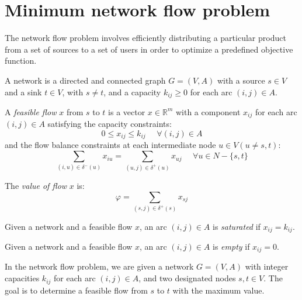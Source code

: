 \section{Minimum network flow problem}

The network flow problem involves efficiently distributing a particular product from a set of sources to a set of users in order to optimize a predefined objective function.
    \begin{definition}
    A network is a directed and connected graph $G = (V,A)$ with a source $s \in V$ and a sink $t \in V$, with $s \neq t$, and a capacity $k_{ij} \geq 0$ for each arc 
    $(i,j) \in A$. 

    A \emph{feasible flow} $x$ from $s$ to $t$ is a vector $x \in \mathbb{R}^m$ with a component $x_{ij}$ for each arc $(i,j) \in A$ satisfying the capacity constraints:
    \[0 \leq x_{ij} \leq k_{ij} \:\:\:\:\:\: \forall (i,j) \in A\]
    and the flow balance constraints at each intermediate node $u \in V (u \neq s,t)$: 
    \[\sum_{(i,u)\in \delta^{-}(u)}x_{iu}=\sum_{(u,j)\in \delta^{+}(u)}x_{uj} \:\:\:\:\:\: \forall u \in N-\{s,t\}\]

    The \emph{value of flow} $x$ is:
    \[\varphi = \sum_{(s,j) \in \delta^{+}(s)} x_{sj}\]

    Given a network and a feasible flow $x$, an arc $(i,j) \in A$ is \emph{saturated} if $x_{ij} = k_{ij}$. 

    Given a network and a feasible flow $x$, an arc $(i,j) \in A$ is \emph{empty} if $x_{ij} = 0$. 
\end{definition}
In the network flow problem, we are given a network $G = (V,A)$ with integer capacities $k_{ij}$ for each arc $(i,j) \in A$, and two designated nodes $s,t \in V$. 
The goal is to determine a feasible flow from $s$ to $t$ with the maximum value.

